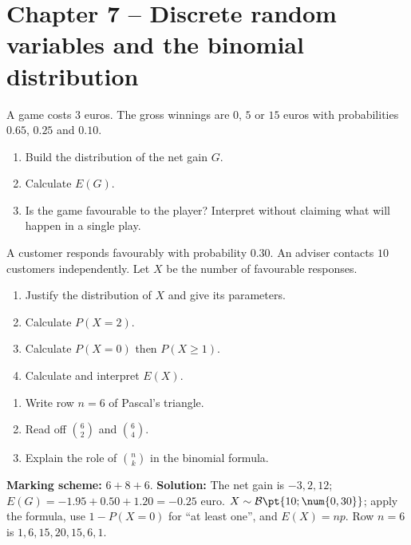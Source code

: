 \section*{Chapter 7 -- Discrete random variables and the binomial distribution}
\begin{exercise}
A game costs $3$ euros. The gross winnings are $0$, $5$ or $15$ euros with probabilities $\num{0,65}$, $\num{0,25}$ and $\num{0,10}$.
\begin{enumerate}
\item Build the distribution of the net gain $G$.
\item Calculate $E(G)$.
\item Is the game favourable to the player? Interpret without claiming what will happen in a single play.
\end{enumerate}
\end{exercise}
\begin{exercise}
A customer responds favourably with probability $\num{0,30}$. An adviser contacts $10$ customers independently. Let $X$ be the number of favourable responses.
\begin{enumerate}
\item Justify the distribution of $X$ and give its parameters.
\item Calculate $P(X=2)$.
\item Calculate $P(X=0)$ then $P(X\geq1)$.
\item Calculate and interpret $E(X)$.
\end{enumerate}
\end{exercise}
\begin{exercise}
\begin{enumerate}
\item Write row $n=6$ of Pascal's triangle.
\item Read off $\binom62$ and $\binom64$.
\item Explain the role of $\binom nk$ in the binomial formula.
\end{enumerate}
\end{exercise}
\begin{solution}\textbf{Marking scheme:} $6+8+6$. \textbf{Solution:} The net gain is $-3,2,12$; $E(G)=-\num{1,95}+\num{0,50}+\num{1,20}=-\num{0,25}$ euro. $X\sim\mathcal B\pt{10;\num{0,30}}$; apply the formula, use $1-P(X=0)$ for ``at least one'', and $E(X)=np$. Row $n=6$ is $1,6,15,20,15,6,1$.\end{solution}


